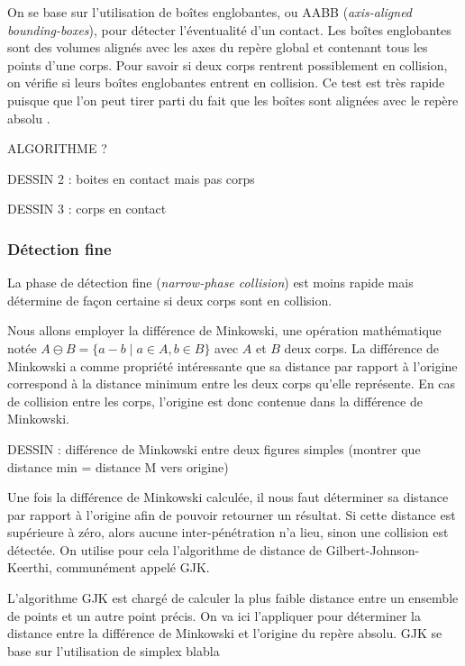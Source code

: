 On se base sur l'utilisation de boîtes englobantes, ou AABB (\textit{axis-aligned bounding-boxes}), pour détecter l'éventualité d'un contact. Les boîtes englobantes sont des volumes alignés avec les axes du repère global et contenant tous les points d'une corps. Pour savoir si deux corps rentrent possiblement en collision, on vérifie si leurs boîtes englobantes entrent en collision. Ce test est très rapide puisque que l'on peut tirer parti du fait que les boîtes sont alignées avec le repère absolu \cite{ericson05}.

ALGORITHME ?

%

DESSIN 2 : boites en contact mais pas corps

DESSIN 3 : corps en contact

\subsubsection{Détection fine}

La phase de détection fine (\textit{narrow-phase collision}) est moins rapide mais détermine de façon certaine si deux corps sont en collision.

Nous allons employer la différence de Minkowski, une opération mathématique notée $A \ominus B = \{a - b \mid a \in A, b \in B\}$ avec $A$ et $B$ deux corps. La différence de Minkowski a comme propriété intéressante que sa distance par rapport à l'origine correspond à la distance minimum entre les deux corps qu'elle représente. En cas de collision entre les corps, l'origine est donc contenue dans la différence de Minkowski.

DESSIN : différence de Minkowski entre deux figures simples (montrer que distance min = distance M vers origine)

Une fois la différence de Minkowski calculée, il nous faut déterminer sa distance par rapport à l'origine afin de pouvoir retourner un résultat. Si cette distance est supérieure à zéro, alors aucune inter-pénétration n'a lieu, sinon une collision est détectée. On utilise pour cela l'algorithme de distance de Gilbert-Johnson-Keerthi, communément appelé GJK.

L'algorithme GJK est chargé de calculer la plus faible distance entre un ensemble de points et un autre point précis. On va ici l'appliquer pour déterminer la distance entre la différence de Minkowski et l'origine du repère absolu. GJK se base sur l'utilisation de simplex blabla


